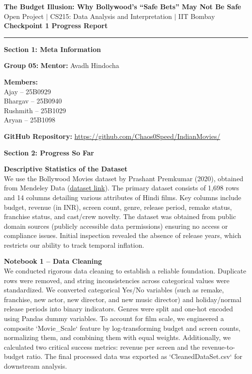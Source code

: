 \documentclass[10pt,a4paper]{article}
\begin{document}
\begin{center}
    {\Large \textbf{\textcolor{primary}{The Budget Illusion: Why Bollywood's ``Safe Bets'' May Not Be Safe}}}\\[2pt]
    {\small Open Project $|$ CS215: Data Analysis and Interpretation $|$ IIT Bombay}\\[2pt]
    {\small \textbf{Checkpoint 1 Progress Report}}\\[1.5pt]
    \rule{\textwidth}{0.4pt}
\end{center}
\vspace{-10.5pt}

\textbf{\textcolor{primary}{Section 1: Meta Information}}

\vspace{1pt}
\textbf{Group 05:} \hfill \textbf{Mentor:} Avadh Hindocha

\textbf{Members:}\\
Ajay -- 25B0929\\
Bhargav -- 25B0940\\
Rushmith -- 25B1029\\
Aryan -- 25B1098

\vspace{12pt}
\textbf{GitHub Repository:} \url{https://github.com/Chaos0Speed/IndianMovies/}

\vspace{5pt}
\textbf{\textcolor{primary}{Section 2: Progress So Far}}

\vspace{1pt}
\textbf{Descriptive Statistics of the Dataset}\\
We use the Bollywood Movies dataset by Prashant Premkumar (2020), obtained from Mendeley Data (\href{https://data.mendeley.com/datasets/3c57btcxy9/1}{dataset link}). The
primary dataset consists of 1,698 rows and 14 columns detailing various attributes of Hindi films. Key columns include
budget, revenue (in INR), screen count, genre, release period, remake status, franchise status, and cast/crew novelty. The
dataset was obtained from public domain sources (publicly accessible data permissions) ensuring no access or compliance
issues. Initial inspection revealed the absence of release years, which restricts our ability to track temporal inflation.

\textbf{Notebook 1 -- Data Cleaning}\\
We conducted rigorous data cleaning to establish a reliable foundation. Duplicate rows were removed, and string inconsistencies
across categorical values were standardized. We converted categorical Yes/No variables (such as remake, franchise, new actor,
new director, and new music director) and holiday/normal release periods into binary indicators. Genres were split and
one-hot encoded using Pandas dummy variables. To account for film scale, we engineered a composite `Movie\_Scale` feature
by log-transforming budget and screen counts, normalizing them, and combining them with equal weights. Additionally, we
calculated two critical success metrics: revenue per screen and the revenue-to-budget ratio. The final processed data was
exported as `CleanedDataSet.csv` for downstream analysis.
\end{document}
